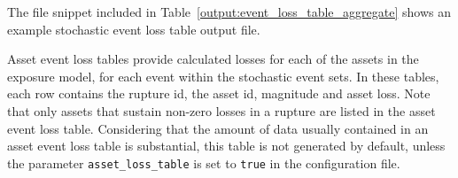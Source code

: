 The file snippet included in Table~\ref{output:event_loss_table_aggregate}
shows an example stochastic event loss table output file.




Asset event loss tables provide calculated losses for each of the assets in
the exposure model, for each event within the stochastic event sets. In these
tables, each row contains the rupture id, the asset id, magnitude and asset
loss. Note that only assets that sustain non-zero losses in a rupture are
listed in the asset event loss table. Considering that the amount of data
usually contained in an asset event loss table is substantial, this table is
not generated by default, unless the parameter \Verb+asset_loss_table+ is set
to \Verb+true+ in the configuration file.
